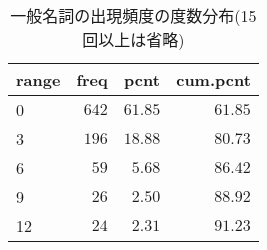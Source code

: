 %
\begin{table}[!tbp]
\caption{一般名詞の出現頻度の度数分布(15回以上は省略)\label{tab:名詞の度数分布}} 
\begin{center}
\begin{tabular}{lrrr}
\toprule
\multicolumn{1}{l}{range}&\multicolumn{1}{c}{freq}&\multicolumn{1}{c}{pcnt}&\multicolumn{1}{c}{cum.pcnt}\tabularnewline
\midrule
0&$642$&$61.85$&$61.85$\tabularnewline
3&$196$&$18.88$&$80.73$\tabularnewline
6&$ 59$&$ 5.68$&$86.42$\tabularnewline
9&$ 26$&$ 2.50$&$88.92$\tabularnewline
12&$ 24$&$ 2.31$&$91.23$\tabularnewline
\bottomrule
\end{tabular}
\end{center}
\end{table}

